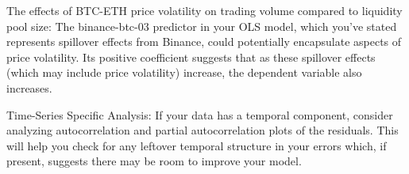 \documentclass{article}
\begin{document}
The effects of BTC-ETH price volatility on trading volume compared to liquidity pool size: The binance-btc-03 predictor in your OLS model, which you've stated represents spillover effects from Binance, could potentially encapsulate aspects of price volatility. Its positive coefficient suggests that as these spillover effects (which may include price volatility) increase, the dependent variable also increases.


Time-Series Specific Analysis: If your data has a temporal component, consider analyzing autocorrelation and partial autocorrelation plots of the residuals. This will help you check for any leftover temporal structure in your errors which, if present, suggests there may be room to improve your model.




%
\end{document}
